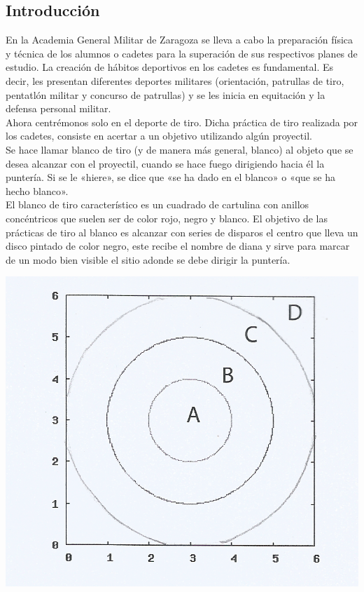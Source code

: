 \documentclass[12pt,a4paper]{article}
\begin{document}
\begin{multicols}{2}
\section{Introducción}

\noindent En la Academia General Militar de Zaragoza se lleva a cabo la preparación física y técnica de los alumnos o cadetes para la superación de sus respectivos planes de estudio. La creación de hábitos deportivos en los cadetes es fundamental. Es decir, les presentan diferentes deportes militares (orientación, patrullas de tiro, pentatlón militar y concurso de patrullas) y se les inicia en equitación y la defensa personal militar.\\
\noindent Ahora centrémonos solo en el deporte de tiro. Dicha práctica de tiro realizada por los cadetes, consiste en acertar a un objetivo utilizando algún proyectil.\\ Se hace llamar blanco de tiro (y de manera más general, blanco) al objeto que se desea alcanzar con el proyectil, cuando se hace fuego dirigiendo hacia él la puntería. Si se le «hiere», se dice que «se ha dado en el blanco» o «que se ha hecho blanco». \\
\noindent El blanco de tiro característico es un cuadrado de cartulina con anillos concéntricos que suelen ser de color rojo, negro y blanco. El objetivo de las prácticas de tiro al blanco es alcanzar con series de disparos el  centro que lleva un disco pintado de color negro, este recibe el nombre de diana y sirve para marcar de un modo bien visible el sitio adonde se debe dirigir la puntería.
\begin{center}
\includegraphics[scale=0.25]{diana.png}\\

\end{center}
\end{multicols}
\end{document}

